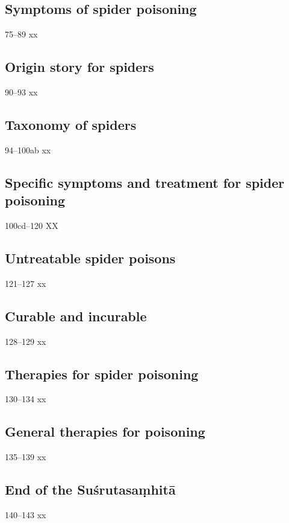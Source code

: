 \begin{translation}
 \subsection{Symptoms of spider poisoning}
 
 \item[75--89] xx
 
 \subsection{Origin story for spiders}
 
 \item[90--93] xx
 
 \subsection{Taxonomy of spiders}
 
 \item[94--100ab] xx
 
 \subsection{Specific symptoms and treatment for spider poisoning}
 
 \item[100cd--120] XX
 
 \subsection{Untreatable spider poisons}
 
 \item [121--127] xx
 
 \subsection{Curable and incurable}
 
 \item[128--129] xx
 
 \subsection{Therapies for spider poisoning}
 
 \item [130--134] xx
 
\subsection{General therapies for poisoning}

\item [135--139] xx

\subsection{End of the Suśrutasaṃhitā}

\item[140--143] xx
 
\end{translation}